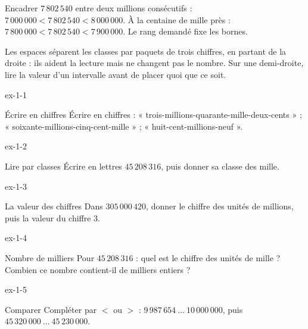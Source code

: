\begin{savoirfaire}Encadrer $7\,802\,540$ entre deux millions consécutifs : $7\,000\,000<7\,802\,540<8\,000\,000$. À la centaine de mille près : $7\,800\,000<7\,802\,540<7\,900\,000$. Le rang demandé fixe les bornes.\end{savoirfaire}
\begin{attention}Les espaces séparent les classes par paquets de trois chiffres, en partant de la droite : ils aident la lecture mais ne changent pas le nombre. Sur une demi-droite, lire la valeur d’un intervalle avant de placer quoi que ce soit.\end{attention}

\clearpage{}
\begin{blocLivre}{ex-1-1}\begin{exercice}[1]{Écrire en chiffres}
Écrire en chiffres : « trois-millions-quarante-mille-deux-cents » ; « soixante-millions-cinq-cent-mille » ; « huit-cent-millions-neuf ».
\end{exercice}\end{blocLivre}
\begin{blocLivre}{ex-1-2}\begin{exercice}[1]{Lire par classes}
Écrire en lettres $45\,208\,316$, puis donner sa classe des mille.
\end{exercice}\end{blocLivre}
\begin{blocLivre}{ex-1-3}\begin{exercice}[1]{La valeur des chiffres}
Dans $305\,000\,420$, donner le chiffre des unités de millions, puis la valeur du chiffre 3.
\end{exercice}\end{blocLivre}
\begin{blocLivre}{ex-1-4}\begin{exercice}[1]{Nombre de milliers}
Pour $45\,208\,316$ : quel est le chiffre des unités de mille ? Combien ce nombre contient-il de milliers entiers ?
\end{exercice}\end{blocLivre}
\begin{blocLivre}{ex-1-5}\begin{exercice}[1]{Comparer}
Compléter par $<$ ou $>$ : $9\,987\,654\ \ldots\ 10\,000\,000$, puis $45\,320\,000\ \ldots\ 45\,230\,000$.
\end{exercice}\end{blocLivre}

